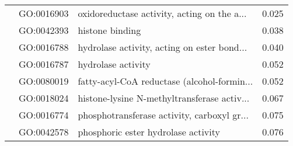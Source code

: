 \begin{longtable}{lllr}
   & GO:0016903 &  oxidoreductase activity, acting on the a... &         0.025 \\
   & GO:0042393 &                              histone binding &         0.038 \\
   & GO:0016788 &  hydrolase activity, acting on ester bond... &         0.040 \\
   & GO:0016787 &                           hydrolase activity &         0.052 \\
   & GO:0080019 &  fatty-acyl-CoA reductase (alcohol-formin... &         0.052 \\
   & GO:0018024 &  histone-lysine N-methyltransferase activ... &         0.067 \\
   & GO:0016774 &  phosphotransferase activity, carboxyl gr... &         0.075 \\
   & GO:0042578 &          phosphoric ester hydrolase activity &         0.076 \\
\end{longtable}
